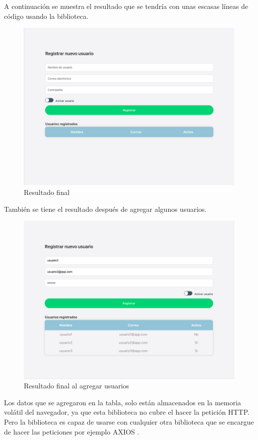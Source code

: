 A continuación se muestra el resultado que se tendría con unas escasas líneas de código usando la biblioteca.
\newline
\begin{figure}[H]
    \includegraphics[width=1\textwidth]{./Imagenes/9.10}
   \centering 
    \caption[Resultado final]{Resultado final}
    \end{figure}
\newline
También se tiene el resultado después de agregar algunos usuarios.
\newline
\begin{figure}[H]
    \includegraphics[width=1\textwidth]{./Imagenes/9.11}
   \centering 
    \caption[Resultado final al agregar usuarios]{Resultado final al agregar usuarios}
    \end{figure}
\newline
Los datos que se agregaron en la tabla, solo están almacenados en la memoria volátil del navegador, ya que esta biblioteca no cubre el hacer la petición HTTP. Pero la biblioteca es capaz de usarse con cualquier otra biblioteca que se encargue de hacer las peticiones por ejemplo AXIOS \cite{axios}.

